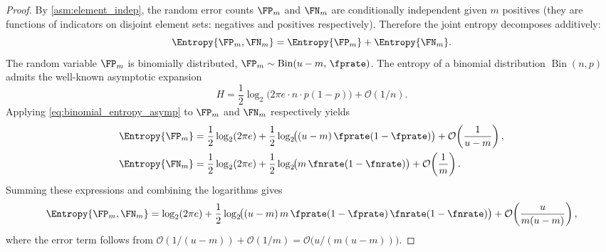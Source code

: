 \begin{proof}
By \cref{asm:element_indep}, the random error counts $\FP_m$ and $\FN_m$
are conditionally independent given $m$ positives (they are functions of
indicators on disjoint element sets: negatives and positives respectively).
Therefore the joint entropy decomposes additively:
\begin{equation}
    \Entropy{\FP_m, \FN_m} = \Entropy{\FP_m} + \Entropy{\FN_m}.
\end{equation}
The random variable $\FP_m$ is binomially distributed,
$\FP_m \sim \operatorname{Bin}(u - m,\, \fprate)$.
The entropy of a binomial distribution $\operatorname{Bin}(n, p)$ admits the
well-known asymptotic expansion~\cite{coverThomas}
\begin{equation}
\label{eq:binomial_entropy_asymp}
    H = \frac{1}{2}\log_2\!\bigl(2\pi e \cdot n \cdot p(1-p)\bigr)
      + \mathcal{O}(1/n).
\end{equation}
Applying \cref{eq:binomial_entropy_asymp} to $\FP_m$ and $\FN_m$ respectively
yields
\begin{align}
    \Entropy{\FP_m}
    &= \frac{1}{2}\log_2(2\pi e)
     + \frac{1}{2}\log_2\!\bigl((u-m)\,\fprate(1-\fprate)\bigr)
     + \mathcal{O}\!\left(\frac{1}{u-m}\right), \\
    \Entropy{\FN_m}
    &= \frac{1}{2}\log_2(2\pi e)
     + \frac{1}{2}\log_2\!\bigl(m\,\fnrate(1-\fnrate)\bigr)
     + \mathcal{O}\!\left(\frac{1}{m}\right).
\end{align}
Summing these expressions and combining the logarithms gives
\begin{equation}
    \Entropy{\FP_m, \FN_m}
    = \log_2(2\pi e)
    + \frac{1}{2}\log_2\!\bigl(
        (u-m)\, m\, \fprate(1-\fprate)\, \fnrate(1-\fnrate)
      \bigr)
    + \mathcal{O}\!\left(\frac{u}{m(u-m)}\right),
\end{equation}
where the error term follows from
$\mathcal{O}(1/(u-m)) + \mathcal{O}(1/m)
 = \mathcal{O}\!\bigl(u / (m(u-m))\bigr)$.
\end{proof}

